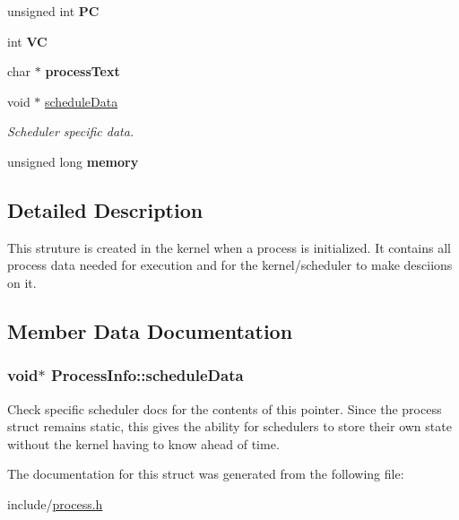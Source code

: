 \begin{DoxyCompactItemize}
\item 
\hypertarget{structProcessInfo_a9b2d3f321f21ec1ee97c8dd5e63ac6c8}{unsigned int {\bfseries \-P\-C}}\label{dd/dc8/structProcessInfo_a9b2d3f321f21ec1ee97c8dd5e63ac6c8}

\item 
\hypertarget{structProcessInfo_ab288b59e794cb506663e22c680e05c2d}{int {\bfseries \-V\-C}}\label{dd/dc8/structProcessInfo_ab288b59e794cb506663e22c680e05c2d}

\item 
\hypertarget{structProcessInfo_ae99b529cb79a446c0ff0d1a851b67fc5}{char $\ast$ {\bfseries process\-Text}}\label{dd/dc8/structProcessInfo_ae99b529cb79a446c0ff0d1a851b67fc5}

\item 
void $\ast$ \hyperlink{structProcessInfo_aea1c50ae92f6421ae5c94ac674c1877a}{schedule\-Data}
\begin{DoxyCompactList}\small\item\em \-Scheduler specific data. \end{DoxyCompactList}\item 
\hypertarget{structProcessInfo_aa65ed051998c0493b68feeea5ae4955f}{unsigned long {\bfseries memory}}\label{dd/dc8/structProcessInfo_aa65ed051998c0493b68feeea5ae4955f}

\end{DoxyCompactItemize}


\subsection{\-Detailed \-Description}
\-This struture is created in the kernel when a process is initialized. \-It contains all process data needed for execution and for the kernel/scheduler to make desciions on it. 

\subsection{\-Member \-Data \-Documentation}
\hypertarget{structProcessInfo_aea1c50ae92f6421ae5c94ac674c1877a}{
\subsubsection[{schedule\-Data}]{\setlength{\rightskip}{0pt plus 5cm}void$\ast$ {\bf \-Process\-Info\-::schedule\-Data}}}\label{dd/dc8/structProcessInfo_aea1c50ae92f6421ae5c94ac674c1877a}
\-Check specific scheduler docs for the contents of this pointer. \-Since the process struct remains static, this gives the ability for schedulers to store their own state without the kernel having to know ahead of time. 

\-The documentation for this struct was generated from the following file\-:\begin{DoxyCompactItemize}
\item 
include/\hyperlink{process_8h}{process.\-h}\end{DoxyCompactItemize}
